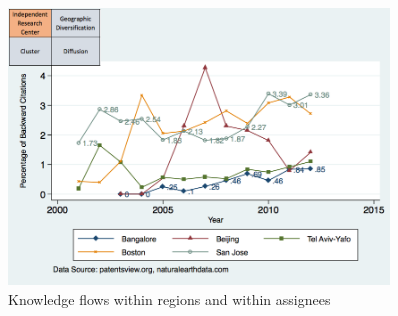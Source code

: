 \documentclass[parskip=full,12pt,letterpaper]{article}
\begin{document}
\begin{figure}[h]
\begin{centering}
  \includegraphics[width=0.90\textwidth]{SMSSameRegionSameAssigneeFlows}
  \caption{Knowledge flows within regions and within assignees}
  \label{fig:SMSSameRegionSameAssigneeFlows}
\end{centering}
\end{figure}
\end{document}
